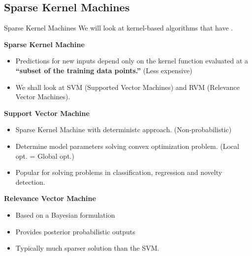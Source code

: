 \documentclass{bredelebeamer}
\begin{document}
\subsection{Sparse Kernel Machines}
\begin{frame}{Sparse Kernel Machines}
  We will look at kernel-based algorithms that have .

  \textbf{Sparse Kernel Machine}
  \begin{itemize}
    \item Predictions for new inputs depend only on the kernel function
          evaluated at a \textbf{``subset of the training data points.''}
          (Less expensive)
    \item We shall look at SVM (Supported Vector Machines) and RVM (Relevance Vector Machines).
  \end{itemize}

  \textbf{Support Vector Machine}
  \begin{itemize}
    \item Sparse Kernel Machine with deterministc approach. (Non-probabilistic)
    \item Determine model parameters solving convex optimization problem.
          (Local opt. = Global opt.)
    \item Popular for solving problems in classification, regression
          and novelty detection.
  \end{itemize}

  \textbf{Relevance Vector Machine}
  \begin{itemize}
    \item Based on a Bayesian formulation
    \item Provides posterior probabilistic outputs
    \item Typically much sparser solution than the SVM.
  \end{itemize}
\end{frame}
\end{document}
